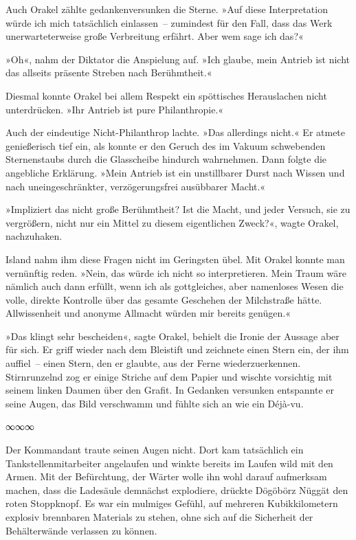 Auch Orakel zählte gedankenversunken die Sterne. »Auf diese Interpretation würde ich mich tatsächlich einlassen~– zumindest für den Fall, dass das Werk unerwarteterweise große Verbreitung erfährt. Aber wem sage ich das?«

»Oh«, nahm der Diktator die Anspielung auf. »Ich glaube, mein Antrieb ist nicht das allseits präsente Streben nach Berühmtheit.«

Diesmal konnte Orakel bei allem Respekt ein spöttisches Herauslachen nicht unterdrücken. »Ihr Antrieb ist pure Philanthropie.«

Auch der eindeutige Nicht-Philanthrop lachte. »Das allerdings nicht.« Er atmete genießerisch tief ein, als konnte er den Geruch des im Vakuum schwebenden Sternenstaubs durch die Glasscheibe hindurch wahrnehmen. Dann folgte die angebliche Erklärung. »Mein Antrieb ist ein unstillbarer Durst nach Wissen und nach uneingeschränkter, verzögerungsfrei ausübbarer Macht.«

»Impliziert das nicht große Berühmtheit? Ist die Macht, und jeder Versuch, sie zu vergrößern, nicht nur ein Mittel zu diesem eigentlichen Zweck?«, wagte Orakel, nachzuhaken.

Island nahm ihm diese Fragen nicht im Geringsten übel. Mit Orakel konnte man vernünftig reden. »Nein, das würde ich nicht so interpretieren. Mein Traum wäre nämlich auch dann erfüllt, wenn ich als gottgleiches, aber namenloses Wesen die volle, direkte Kontrolle über das gesamte Geschehen der Milchstraße hätte. Allwissenheit und anonyme Allmacht würden mir bereits genügen.«

»Das klingt sehr bescheiden«, sagte Orakel, behielt die Ironie der Aussage aber für sich. Er griff wieder nach dem Bleistift und zeichnete einen Stern ein, der ihm auffiel~– einen Stern, den er glaubte, aus der Ferne wiederzuerkennen. Stirnrunzelnd zog er einige Striche auf dem Papier und wischte vorsichtig mit seinem linken Daumen über den Grafit. In Gedanken versunken entspannte er seine Augen, das Bild verschwamm und fühlte sich an wie ein Déjà-vu.

\begin{center}
∞∞∞
\end{center}

Der Kommandant traute seinen Augen nicht. Dort kam tatsächlich ein Tankstellenmitarbeiter angelaufen und winkte bereits im Laufen wild mit den Armen. Mit der Befürchtung, der Wärter wolle ihn wohl darauf aufmerksam machen, dass die Ladesäule demnächst explodiere, drückte Dögöbörz Nüggät den roten Stoppknopf. Es war ein mulmiges Gefühl, auf mehreren Kubikkilometern explosiv brennbaren Materials zu stehen, ohne sich auf die Sicherheit der Behälterwände verlassen zu können.

